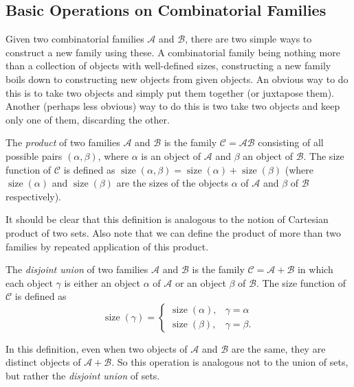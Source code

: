 \documentclass[11pt,a5paper]{amsart}
\newcommand{\cat}{\mathcal}
\DeclareMathOperator{\size}{size}
\begin{document}
\subsection{Basic Operations on Combinatorial Families}
Given two combinatorial families $\cat A$ and $\cat B$, there are two simple ways to construct a new family using these. A combinatorial family being nothing more than a collection of objects with well-defined sizes, constructing a new family boils down to constructing new objects from given objects. An obvious way to do this is to take two objects and simply put them together (or juxtapose them). Another (perhaps less obvious) way to do this is two take two objects and keep only one of them, discarding the other.
\begin{Definition}[label=def:prodFam]
The \emph{product} of two families $\cat A$ and $\cat B$ is the family $\cat C = \cat A \cat B$ consisting of all possible pairs $(\alpha, \beta)$, where $\alpha$ is an object of $\cat A$ and $\beta$ an object of $\cat B$. The size function of $\cat C$ is defined as $\size(\alpha, \beta) = \size(\alpha) + \size(\beta)$ (where $\size(\alpha)$ and $\size(\beta)$ are the sizes of the objects $\alpha$ of $\cat A$ and $\beta$ of $\cat B$ respectively).
\end{Definition}
It should be clear that this definition is analogous to the notion of Cartesian product of two sets. Also note that we can define the product of more than two families by repeated application of this product.
\begin{Definition}[label=def:disjUnionFam]
The \emph{disjoint union} of two families $\cat A$ and $\cat B$ is the family $\cat C = \cat A + \cat B$ in which each object $\gamma$ is either an object $\alpha$ of $\cat A$ or an object $\beta$ of $\cat B$. The size function of $\cat C$ is defined as
\begin{equation*}
\size(\gamma) = \begin{cases}
\size(\alpha), & \gamma = \alpha\\
\size(\beta), & \gamma = \beta.
\end{cases}
\end{equation*}
\end{Definition}

\begin{Remark}
In this definition, even when two objects of $\cat A$ and $\cat B$ are the same, they are distinct objects of $\cat A + \cat B$. So this operation is analogous not to the union of sets, but rather the \emph{disjoint union} of sets.
\end{Remark}
\end{document}
